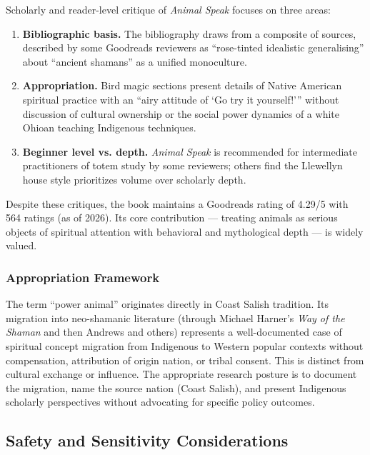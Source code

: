 \documentclass[11pt,letterpaper]{article}
\begin{document}
Scholarly and reader-level critique of \emph{Animal Speak} focuses on three areas:
\begin{enumerate}[noitemsep]
  \item \textbf{Bibliographic basis.} The bibliography draws from a composite of sources, described by some Goodreads reviewers as ``rose-tinted idealistic generalising'' about ``ancient shamans'' as a unified monoculture.
  \item \textbf{Appropriation.} Bird magic sections present details of Native American spiritual practice with an ``airy attitude of `Go try it yourself!''' without discussion of cultural ownership or the social power dynamics of a white Ohioan teaching Indigenous techniques.
  \item \textbf{Beginner level vs. depth.} \emph{Animal Speak} is recommended for intermediate practitioners of totem study by some reviewers; others find the Llewellyn house style prioritizes volume over scholarly depth.
\end{enumerate}

Despite these critiques, the book maintains a Goodreads rating of 4.29/5 with 564 ratings (as of 2026). Its core contribution --- treating animals as serious objects of spiritual attention with behavioral and mythological depth --- is widely valued.

\subsubsection{Appropriation Framework}

The term ``power animal'' originates directly in Coast Salish tradition. Its migration into neo-shamanic literature (through Michael Harner's \emph{Way of the Shaman} and then Andrews and others) represents a well-documented case of spiritual concept migration from Indigenous to Western popular contexts without compensation, attribution of origin nation, or tribal consent. This is distinct from cultural exchange or influence. The appropriate research posture is to document the migration, name the source nation (Coast Salish), and present Indigenous scholarly perspectives without advocating for specific policy outcomes.

\subsection{Safety and Sensitivity Considerations}
\end{document}
